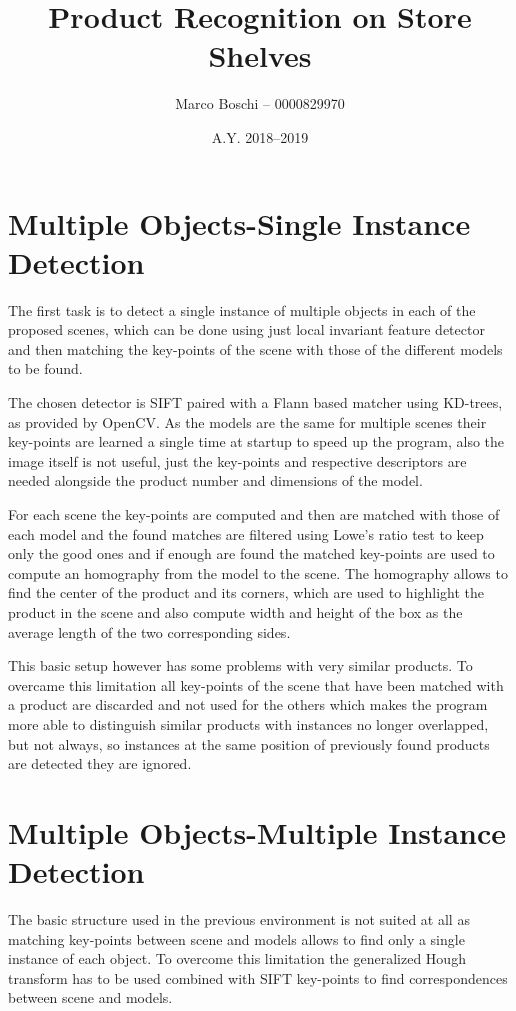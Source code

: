

\title{Product Recognition on Store Shelves}
\date{A.Y. 2018--2019}
\author{Marco Boschi -- 0000829970}




\section{Multiple Objects-Single Instance Detection}
The first task is to detect a single instance of multiple objects in each of the proposed scenes, which can be done using just local invariant feature detector and then matching the key-points of the scene with those of the different models to be found.

The chosen detector is SIFT paired with a Flann based matcher using KD-trees, as provided by OpenCV.
As the models are the same for multiple scenes their key-points are learned a single time at startup to speed up the program, also the image itself is not useful, just the key-points and respective descriptors are needed alongside the product number and dimensions of the model.

For each scene the key-points are computed and then are matched with those of each model and the found matches are filtered using Lowe's ratio test to keep only the good ones and if enough are found the matched key-points are used to compute an homography from the model to the scene.
The homography allows to find the center of the product and its corners, which are used to highlight the product in the scene and also compute width and height of the box as the average length of the two corresponding sides.

This basic setup however has some problems with very similar products.
To overcame this limitation all key-points of the scene that have been matched with a product are discarded and not used for the others which makes the program more able to distinguish similar products with instances no longer overlapped, but not always, so instances at the same position of previously found products are detected they are ignored.

\section{Multiple Objects-Multiple Instance Detection}
The basic structure used in the previous environment is not suited at all as matching key-points between scene and models allows to find only a single instance of each object.
To overcome this limitation the generalized Hough transform has to be used combined with SIFT key-points to find correspondences between scene and models.

